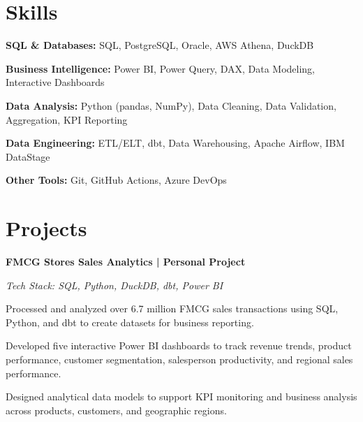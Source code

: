     \section{Skills}
    \begin{onecolentry}
        \textbf{SQL \& Databases:} SQL, PostgreSQL, Oracle, AWS Athena, DuckDB
    \end{onecolentry}
    \vspace{0.1cm}
    \begin{onecolentry}
        \textbf{Business Intelligence:} Power BI, Power Query, DAX, Data Modeling, Interactive Dashboards
    \end{onecolentry}
    \vspace{0.1cm}
    \begin{onecolentry}
        \textbf{Data Analysis:} Python (pandas, NumPy), Data Cleaning, Data Validation, Aggregation, KPI Reporting
    \end{onecolentry}
    \vspace{0.1cm}
    \begin{onecolentry}
        \textbf{Data Engineering:} ETL/ELT, dbt, Data Warehousing, Apache Airflow, IBM DataStage
    \end{onecolentry}
    \vspace{0.1cm}
    \begin{onecolentry}
        \textbf{Other Tools:} Git, GitHub Actions, Azure DevOps
    \end{onecolentry}

    \newpage
    \section{Projects}
    \vspace{0.1cm}   
    \begin{twocolentry}{}
        \textbf{FMCG Stores Sales Analytics | Personal Project}
        \href{https://github.com/NguyenHa554/FMCG_stores/tree/main}{\faGithub}
    \end{twocolentry}
    \vspace{0.1cm}
    \begin{onecolentry}
        \textit{Tech Stack: SQL, Python, DuckDB, dbt, Power BI}
        \begin{highlights}
            \item Processed and analyzed over 6.7 million FMCG sales transactions using SQL, Python, and dbt to create datasets for business reporting.
            \item Developed five interactive Power BI dashboards to track revenue trends, product performance, customer segmentation, salesperson productivity, and regional sales performance.
            \item Designed analytical data models to support KPI monitoring and business analysis across products, customers, and geographic regions.
        \end{highlights}
    \end{onecolentry}

